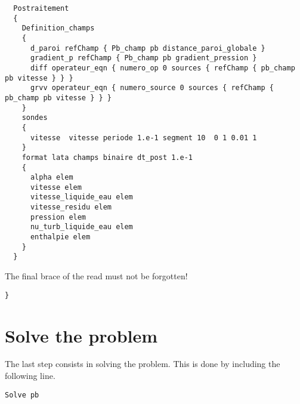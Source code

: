 \begin{lstlisting}
  Postraitement
  {
    Definition_champs 	
    {
      d_paroi refChamp { Pb_champ pb distance_paroi_globale }
      gradient_p refChamp { Pb_champ pb gradient_pression }	
      diff operateur_eqn { numero_op 0 sources { refChamp { pb_champ pb vitesse } } }
      grvv operateur_eqn { numero_source 0 sources { refChamp { pb_champ pb vitesse } } }
    }
    sondes
    {
      vitesse  vitesse periode 1.e-1 segment 10  0 1 0.01 1
    }
    format lata champs binaire dt_post 1.e-1
    {
      alpha elem
      vitesse elem
      vitesse_liquide_eau elem
      vitesse_residu elem
      pression elem
      nu_turb_liquide_eau elem		
      enthalpie elem
    }
  }
\end{lstlisting}

The final brace of the read must not be forgotten!
\begin{lstlisting}
}
\end{lstlisting}

\section{Solve the problem}\label{data:solve}
The last step consists in solving the problem. This is done by including the following line.
\begin{lstlisting}
Solve pb
\end{lstlisting}

